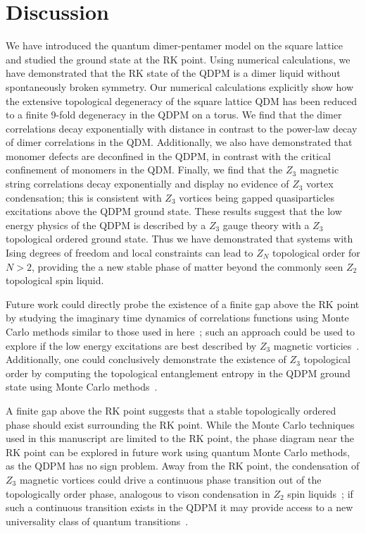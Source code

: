 \documentclass[twocolumn,prb,aps,floatfix,superscriptaddress]{revtex4-1}
\begin{document}
\section{Discussion}
\label{sec:discussion}

We have introduced the quantum dimer-pentamer model on the square lattice and studied the ground state at the RK point. Using numerical calculations, we have demonstrated that the RK state of the QDPM is a dimer liquid without spontaneously broken symmetry. Our numerical calculations explicitly show how the extensive topological degeneracy of the square lattice QDM has been reduced to a finite 9-fold degeneracy in the QDPM on a torus. We find that the dimer correlations decay exponentially with distance in contrast to the power-law decay of dimer correlations in the QDM. Additionally, we also have demonstrated that monomer defects are deconfined in the QDPM, in contrast with the critical confinement of monomers in the QDM. Finally, we find that the $Z_3$ magnetic string correlations decay exponentially and display no evidence of $Z_3$ vortex condensation; this is consistent with $Z_3$ vortices being gapped quasiparticles excitations above the QDPM ground state. These results suggest that the low energy physics of the QDPM is described by a $Z_3$ gauge theory with a $Z_3$ topological ordered ground state. Thus we have demonstrated that systems with Ising degrees of freedom and local constraints can lead to $Z_N$ topological order for $N>2$, providing the a new stable phase of matter beyond the commonly seen $Z_2$ topological spin liquid.

Future work could directly probe the existence of a finite gap above the RK point by studying the imaginary time dynamics of correlations functions using Monte Carlo methods similar to those used in here~\cite{Henley1997,Henley2004a}; such an approach could be used to explore if the low energy excitations are best described by $Z_3$ magnetic vorticies~\cite{Ivanov2004,Ralko2007,Misguich2008d}. Additionally, one could conclusively demonstrate the existence of $Z_3$ topological order by computing the topological entanglement entropy in the QDPM ground state using Monte Carlo methods~\cite{Levin2005a,Kitaev2006b,Hastings2010}. 

A finite gap above the RK point suggests that a stable topologically ordered phase should exist surrounding the RK point. While the Monte Carlo techniques used in this manuscript are limited to the RK point, the phase diagram near the RK point can be explored in future work using quantum Monte Carlo methods, as the QDPM has no sign problem. Away from the RK point, the condensation of $Z_3$ magnetic vortices could drive a continuous phase transition out of the topologically order phase, analogous to vison condensation in $Z_2$ spin liquids~\cite{Jalabert1991,Ralko2007,Huh2011,Hao2014,Slagle2014}; if such a continuous transition exists in the QDPM it may provide access to a new universality class of quantum transitions~\cite{XU2012}.
\end{document}
